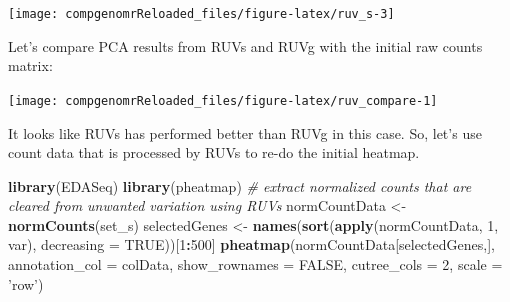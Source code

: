 \documentclass[12pt,]{krantz}
\newenvironment{Shaded}{\begin{snugshade}}{\end{snugshade}}
\newcommand{\CommentTok}[1]{\textcolor[rgb]{0.56,0.35,0.01}{\textit{#1}}}
\newcommand{\DataTypeTok}[1]{\textcolor[rgb]{0.13,0.29,0.53}{#1}}
\newcommand{\DecValTok}[1]{\textcolor[rgb]{0.00,0.00,0.81}{#1}}
\newcommand{\KeywordTok}[1]{\textcolor[rgb]{0.13,0.29,0.53}{\textbf{#1}}}
\newcommand{\NormalTok}[1]{#1}
\newcommand{\OperatorTok}[1]{\textcolor[rgb]{0.81,0.36,0.00}{\textbf{#1}}}
\newcommand{\OtherTok}[1]{\textcolor[rgb]{0.56,0.35,0.01}{#1}}
\newcommand{\StringTok}[1]{\textcolor[rgb]{0.31,0.60,0.02}{#1}}
\begin{document}
\begin{center}\texttt{[image: compgenomrReloaded\_files/figure-latex/ruv\_s-3]} \end{center}

Let's compare PCA results from RUVs and RUVg with the initial raw counts matrix:

\begin{Shaded}
\end{Shaded}

\begin{center}\texttt{[image: compgenomrReloaded\_files/figure-latex/ruv\_compare-1]} \end{center}

It looks like RUVs has performed better than RUVg in this case. So, let's use count data that is processed by RUVs to re-do the initial heatmap.

\begin{Shaded}
\begin{Highlighting}[]
\KeywordTok{library}\NormalTok{(EDASeq)}
\KeywordTok{library}\NormalTok{(pheatmap)}
\CommentTok{# extract normalized counts that are cleared from unwanted variation using RUVs}
\NormalTok{normCountData <-}\StringTok{ }\KeywordTok{normCounts}\NormalTok{(set_s)}
\NormalTok{selectedGenes <-}\StringTok{ }\KeywordTok{names}\NormalTok{(}\KeywordTok{sort}\NormalTok{(}\KeywordTok{apply}\NormalTok{(normCountData, }\DecValTok{1}\NormalTok{, var), }\DataTypeTok{decreasing =} \OtherTok{TRUE}\NormalTok{))[}\DecValTok{1}\OperatorTok{:}\DecValTok{500}\NormalTok{]}
\KeywordTok{pheatmap}\NormalTok{(normCountData[selectedGenes,], }
         \DataTypeTok{annotation_col =}\NormalTok{ colData, }
         \DataTypeTok{show_rownames =} \OtherTok{FALSE}\NormalTok{, }
         \DataTypeTok{cutree_cols =} \DecValTok{2}\NormalTok{,}
         \DataTypeTok{scale =} \StringTok{'row'}\NormalTok{)}
\end{Highlighting}
\end{Shaded}
\end{document}

